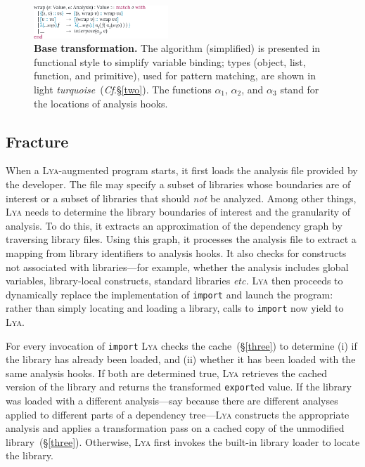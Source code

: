 \documentclass[letterpaper,twocolumn,10pt]{article}
\def\etc{{\em etc.}\xspace}
\newcommand{\ttt}[1]{\texttt{#1}}
\newcommand{\cf}[1]{(\emph{Cf}.\S\ref{#1})}
\newcommand{\sx}[1]{(\S\ref{#1})}
\newcommand{\sys}{{\scshape Lya}\xspace}
\begin{document}
\begin{figure}[t]
\raggedleft 
\includegraphics[width=0.45\textwidth]{./figs/lya_base.pdf}
\caption{
  \textbf{Base transformation.}
  \textmd{
  The algorithm (simplified) is presented in functional style to simplify variable binding; types (object, list, function, and primitive), used for pattern matching, are shown in light {\color{cdb} \emph{turquoise}}~\cf{two}. The functions $\alpha_1$, $\alpha_2$, and $\alpha_3$ stand for the locations of analysis hooks.
  }
  \vspace{-4mm}
}
\label{fig:base}
\end{figure}

\subsection{Fracture}
\label{one}

When a \sys-augmented program starts, it first loads the analysis file provided by the developer. 
The file may specify a subset of libraries whose boundaries are of interest or a subset of libraries that should \emph{not} be analyzed.
Among other things, \sys needs to determine the library boundaries of interest and the granularity of analysis.
To do this, it extracts an approximation of the dependency graph by traversing library files.
Using this graph, it processes the analysis file to extract a mapping from library identifiers to analysis hooks.
It also checks for constructs not associated with libraries---for example, whether the analysis includes global variables, library-local constructs, standard libraries \etc
\sys then proceeds to dynamically replace the implementation of \ttt{import} and launch the program:
  rather than simply locating and loading a library, calls to \ttt{import} now yield to \sys.

For every invocation of \ttt{import} \sys checks the cache~\sx{three} to determine
  (i) if the library has already been loaded, and
  (ii) whether it has been loaded with the same analysis hooks.
If both are determined true, \sys retrieves the cached version of the library and returns the transformed \ttt{export}ed value.
If the library was loaded with a different analysis---say because there are different analyses applied to different parts of a dependency tree---\sys constructs the appropriate analysis and applies a transformation pass on a cached copy of the unmodified library~\sx{three}.
Otherwise, \sys first invokes the built-in library loader to locate the library.
\end{document}
